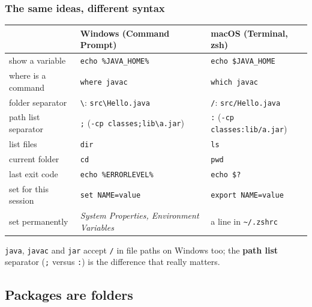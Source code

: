 \documentclass[aspectratio=169,10pt,compress]{beamer}
\begin{document}
\begin{frame}[t,fragile] \frametitle{The same ideas, different syntax}
  \small
  \begin{tabular}{@{}L{0.26\textwidth}L{0.33\textwidth}L{0.33\textwidth}@{}}
    \toprule
                            & \textbf{Windows (Command Prompt)}       & \textbf{macOS (Terminal, zsh)} \\
    \midrule
    show a variable         & \texttt{echo \%JAVA\_HOME\%}           & \texttt{echo \$JAVA\_HOME} \\
    where is a command      & \texttt{where javac}                   & \texttt{which javac} \\
    folder separator        & \texttt{\textbackslash}: \texttt{src\textbackslash Hello.java} & \texttt{/}: \texttt{src/Hello.java} \\
    path list separator     & \texttt{;} \quad (\texttt{-cp classes;lib\textbackslash a.jar}) & \texttt{:} \quad (\texttt{-cp classes:lib/a.jar}) \\
    list files              & \texttt{dir}                           & \texttt{ls} \\
    current folder          & \texttt{cd}                            & \texttt{pwd} \\
    last exit code          & \texttt{echo \%ERRORLEVEL\%}           & \texttt{echo \$?} \\
    set for this session    & \texttt{set NAME=value}                & \texttt{export NAME=value} \\
    set permanently         & \emph{System Properties, Environment Variables} & a line in \texttt{\textasciitilde/.zshrc} \\
    \bottomrule
  \end{tabular}

  \vspace{0.6em}
  \texttt{java}, \texttt{javac} and \texttt{jar} accept \texttt{/} in file paths on Windows too; the \textbf{path list} separator
  (\texttt{;} versus \texttt{:}) is the difference that really matters.
\end{frame}


\subsection[Packages]{Packages are folders}
\end{document}
